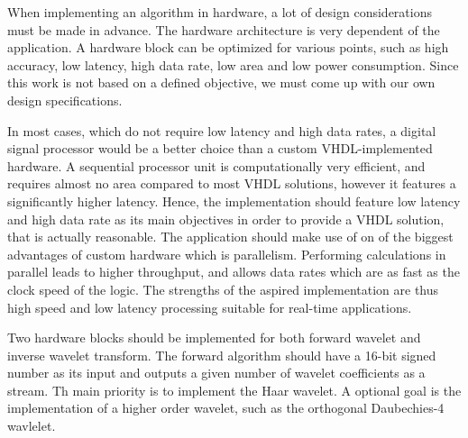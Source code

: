 \begin{refsection}
When implementing an algorithm in hardware, a lot of design considerations must be made in advance.
The hardware architecture is very dependent of the application.
A hardware block can be optimized for various points, such as high accuracy, low latency, high data rate, low area and low power consumption.
Since this work is not based on a defined objective, we must come up with our own design specifications.

In most cases, which do not require low latency and high data rates, a digital signal processor would be a better choice than a custom VHDL-implemented hardware.
A sequential processor unit is computationally very efficient, and requires almost no area compared to most VHDL solutions, however it features a significantly higher latency.
Hence, the implementation should feature low latency and high data rate as its main objectives in order to provide a VHDL solution, that is actually reasonable.
The application should make use of on of the biggest advantages of custom hardware which is parallelism.
Performing calculations in parallel leads to higher throughput, and allows data rates which are as fast as the clock speed of the logic.
The strengths of the aspired implementation are thus high speed and low latency processing suitable for real-time applications.

Two hardware blocks should be implemented for both forward wavelet and inverse wavelet transform.
The forward algorithm should have a 16-bit signed number as its input and outputs a given number of wavelet coefficients as a stream.
Th main priority is to implement the Haar wavelet.
A optional goal is the implementation of a higher order wavelet, such as the orthogonal Daubechies-4 wavlelet.


%
%	
%


\end{refsection}
